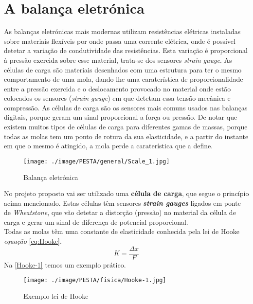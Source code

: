 \section{A balança eletrónica}
As balanças eletrónicas mais modernas utilizam resistências elétricas instaladas sobre materiais flexíveis por onde passa uma corrente elétrica, onde é possível detetar a variação de condutividade das resistências. Esta variação é proporcional à pressão exercida sobre esse material, trata-se dos sensores \textit{strain gauge}. As células de carga são materiais desenhados com uma estrutura para ter o mesmo comportamento de uma mola, dando-lhe uma caraterística de proporcionalidade entre a pressão exercida e o deslocamento provocado no material onde estão colocados os sensores (\textit{strain gauge}) em que detetam essa tensão mecânica e compressão. As células de carga são os sensores mais comuns usados nas balanças digitais, porque geram um sinal proporcional a força ou pressão. De notar que existem muitos tipos de células de carga para diferentes gamas de massas, porque todas as molas tem um ponto de rotura da sua elasticidade, e a partir do instante em que o mesmo é atingido, a mola perde a caraterística que a define.
\\
\begin{figure}[H]
	\centering
	\texttt{[image: ./image/PESTA/general/Scale\_1.jpg]}
	\caption{Balança eletrónica}
	\label{Scale_1}
\end{figure}
No projeto proposto vai ser utilizado uma \textbf{célula de carga}, que segue o princípio acima mencionado. Estas células têm sensores \textit{\textbf{strain gauges}} ligados em ponte de \textit{Wheatstone}, que vão detetar a distorção (pressão) no material da célula de carga e gerar um sinal de diferença de potencial proporcional. %
\\
Todas as molas têm uma constante de elasticidade conhecida pela lei de Hooke \cite{book-3} \textit{equação} \eqref{eq:Hooke}.\\
\begin{equation}
	\label{eq:Hooke}
	K = \frac{\Delta x}{F}
\end{equation}
Na \autoref{Hooke-1} temos um exemplo prático.
\begin{figure}[H]
	\centering
	\texttt{[image: ./image/PESTA/fisica/Hooke-1.jpg]}
	\caption{Exemplo lei de Hooke \cite{book-3}}
	\label{Hooke-1}
\end{figure}
